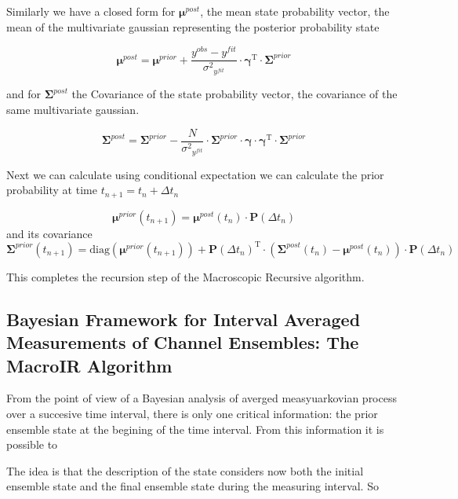 \documentclass[pdflatex,sn-mathphys-num]{sn-jnl}%
\theoremstyle{thmstyleone}%
\theoremstyle{thmstyletwo}%
\theoremstyle{thmstylethree}%
\begin{document}
Similarly we have a closed form for $\mathbf \mu^{post}$, the mean state probability vector, the mean of the multivariate gaussian representing the posterior probability state 

\begin{equation}
	\mathbf \mu^{post}= \mathbf \mu^{prior} + {\frac {y^{obs} - y^{fit}}{{\sigma^2}_{y^{fit}} }}\cdot {\mathbf \gamma}^\mathrm{T} \cdot \mathbf \Sigma^{prior} 
\end{equation}

and for $\mathbf \Sigma^{post}$ the Covariance of the state probability vector, the covariance of the same multivariate gaussian. 
 

\begin{equation}
	\mathbf \Sigma^{post} = \mathbf \Sigma^{prior} - {\frac {N}{{\sigma^2}_{y^{fit}}}}\cdot \mathbf \Sigma^{prior} \cdot \mathbf \gamma \cdot {\mathbf \gamma}^\mathrm{T} \cdot \mathbf \Sigma^{prior}
\end{equation}


Next we can calculate using conditional expectation we can calculate the prior probability at time $t_{n+1}= t_n+\Delta t_n$  


\begin{equation}
	\mathbf \mu^{prior}(t_{n+1}) = \mathbf \mu^{post}(t_n) \cdot \mathbf P(\Delta t_n)
\end{equation}
and its covariance 
\begin{equation}
	\mathbf \Sigma^{prior}(t_{n+1})= \mathrm{diag}(\mathbf \mu^{prior}(t_{n+1}) ) + {\mathbf P(\Delta t_n)}^\mathrm{T} \cdot (\mathbf \Sigma^{post}(t_{n})- \mathbf \mu^{post}(t_{n})) \cdot \mathbf P(\Delta t_n)
\end{equation}

This completes the recursion step of the Macroscopic Recursive algorithm. 

\subsection{Bayesian Framework for Interval Averaged Measurements of Channel Ensembles: The MacroIR Algorithm}

From the point of view of a Bayesian analysis of averged measyuarkovian process over a succesive time interval, there is only one critical information: the prior ensemble state at the begining of the time interval. From this information it is possible to  


The idea is that the description of the state considers now both the initial ensemble state and the final ensemble state during the measuring interval. 
So 
\end{document}
